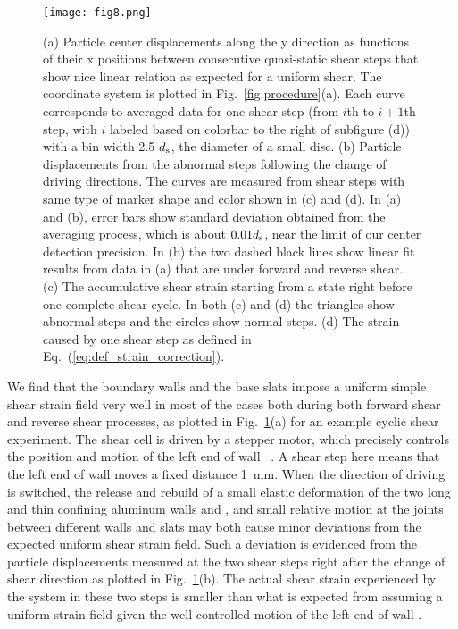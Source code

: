 \documentclass[twocolumn,showkeys,superscriptaddress,preprintnumbers,amsmath,amssymb,showpacs,prx,longbibliography]{revtex4-2}
\def\X#1{
        \raisebox{.9pt}{\textcircled{\raisebox{-.9pt}{#1}}}
}
\begin{document}
\begin{figure}[!ht]
    \centering
    \texttt{[image: fig8.png]}
    \caption{(a) Particle center displacements along the y direction as functions of their x positions between consecutive quasi-static shear steps that show nice linear relation as expected for a uniform shear. The coordinate system is plotted in Fig.~\ref{fig:procedure}(a). Each curve corresponds to averaged data for one shear step (from $i$th to $i+1$th step, with $i$ labeled based on colorbar to the right of subfigure (d)) with a bin width 2.5 $d_{\rm s}$, the diameter of a small disc. (b) Particle displacements from the abnormal steps following the change of driving directions. The curves are measured from shear steps with same type of marker shape and color shown in (c) and (d). In (a) and (b), error bars show standard deviation obtained from the averaging process, which is about $0.01d_{\rm s}$, near the limit of our center detection precision. In (b) the two dashed black lines show linear fit results from data in (a) that are under forward and reverse shear. (c) The accumulative shear strain starting from a state right before one complete shear cycle. In both (c) and (d) the triangles show abnormal steps and the circles show normal steps. (d) The strain caused by one shear step as defined in Eq.~(\ref{eq:def_strain_correction}).}
    \label{fig:sm:strain_correction}
\end{figure}



We find that the boundary walls and the base slats impose a uniform simple shear strain field very well in most of the cases both during both forward shear and reverse shear processes, as plotted in Fig.~\ref{fig:sm:strain_correction}(a) for an example cyclic shear experiment. The shear cell is driven by a stepper motor, which precisely controls the position and motion of the left end of wall \X4~\cite{ren2013_thesis,wang2018_phd}. A shear step here means that the left end of wall \X4 moves a fixed distance 1~mm. When the direction of driving is switched, the release and rebuild of a small elastic deformation of the two long and thin confining aluminum walls \X3 and \X4, and small relative motion at the joints between different walls and slats  may both cause minor deviations from the expected uniform shear strain field. Such a deviation is evidenced from the particle displacements measured at the two shear steps right after the change of shear direction as plotted in Fig.~\ref{fig:sm:strain_correction}(b). The actual shear strain experienced by the system in these two steps is smaller than what is expected from assuming a uniform strain field given the well-controlled motion of the left end of wall \X4.
\end{document}
